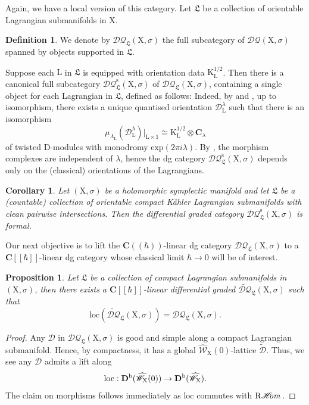 \documentclass{article}
\theoremstyle{plain}
\newtheorem{corollary}[theorem]{Corollary}
\newtheorem{proposition}[theorem]{Proposition}
\theoremstyle{definition}
\newtheorem{definition}[theorem]{Definition}
\theoremstyle{remark}
\newcommand{\Db}{{\mathrm{\bf{D}}}^{\mr{b}}}
\newcommand{\mr}{\mathrm}
\newcommand{\C}{\mathbf C}
\newcommand{\brak}{[\![\hbar]\!]}
\newcommand{\cbrak}{(\!(\hbar)\!)}
\newcommand{\3}{\vspace{3mm}}
\newcommand{\2}{\vspace{2mm}}
\newcommand{\1}{\vspace{1mm}}
\newcommand*{\shom}{\mathscr{H}\text{\kern -3pt {\it{om}}}\,}
\begin{document}
Again, we have a local version of this category. Let $\mathfrak{L}$ be a collection of orientable Lagrangian submanifolds in $\mr{X}$.
\2
\begin{definition}
 We denote by $\mathcal{DQ}_\mathfrak{L}(\mr{X},\sigma)$ the full subcategory of $\mathcal{DQ}(\mr{X},\sigma)$ spanned by objects supported in $\mathfrak{L}$.
 \end{definition}
 Suppose each $\mr{L}$ in $\mathfrak{L}$ is equipped with orientation data $\mr{K}_\mr{L}^{1/2}$. Then there is a canonical full subcategory $\mathcal{DQ}^{\mr{s}}_\mathfrak{L}(\mr{X},\sigma)$ of $\mathcal{DQ}_\mathfrak{L}(\mr{X},\sigma)$, containing a single object for each Lagrangian in $\mathfrak{L}$, defined as follows: Indeed, by \cite{MR2331247} and \cite{saf}, up to isomorphism, there exists a unique quantised orientation $\mathscr{D}^\lambda_\mr{L}$ such that there is an isomorphism $$\mu_{\Lambda_\mr{L}}\left(\mathscr{D}^\lambda_\mr{L}\right)|_{\mr{L}\times 1}\cong \mr{K}_\mr{L}^{1/2}\otimes\C_\lambda$$ of twisted $\mr{D}$-modules with monodromy $\mr{exp}(2\pi i \lambda)$. By \cite{MR4678893}, the morphism complexes are independent of $\lambda$, hence the dg category $\mathcal{DQ}^{\mr{s}}_\mathfrak{L}(\mr{X},\sigma)$ depends only on the (classical) orientations of the Lagrangians.
\2 
\begin{corollary}
Let $(\mr{X},\sigma)$ be a holomorphic symplectic manifold and let $\mathfrak{L}$ be a (countable) collection of orientable compact K\"{a}hler Lagrangian submanifolds with clean pairwise intersections. Then the differential graded category $\mathcal{DQ}^\mr{s}_\mathfrak{L}(\mr{X},\sigma)$ is formal.
\end{corollary}
Our next objective is to lift the $\C\cbrak$-linear dg category $\mathcal{DQ}_\mathfrak{L}(\mr{X},\sigma)$ to a $\C\brak$-linear dg category whose classical limit $\hbar \to 0$ will be of interest.
\2
 \begin{proposition}\label{lift}
Let $\mathfrak{L}$ be a collection of compact Lagrangian submanifolds in $(\mr{X},\sigma)$, then there exists a $\C\brak$-linear differential graded $\widetilde{\mathcal{DQ}}_\mathfrak{L}(\mr{X},\sigma)$ such that $$\mr{loc}\left(\widetilde{\mathcal{DQ}}_\mathfrak{L}(\mr{X},\sigma)\right)=\mathcal{DQ}_\mathfrak{L}(\mr{X},\sigma).$$ 
\end{proposition}
\begin{proof}
Any $\mathscr{D}$ in $\mathcal{DQ}_\mathfrak{L}(\mr{X},\sigma)$ is good and simple along a compact Lagrangian submanifold. Hence, by compactness, it has a global $\widehat{\mathscr{W}}_\mr{X}(0)$-lattice $\widetilde{\mathscr{D}}$. Thus, we see any $\mathscr{D}$ admits a lift along $$\mr{loc}:\Db(\widehat{\mathscr{W}}_\mr{X}(0))\to \Db(\widehat{\mathscr{W}}_\mr{X}).$$ The claim on morphisms follows immediately as $\mr{loc}$ commutes with $\mr{R}\shom$.
\end{proof}
\end{document}
